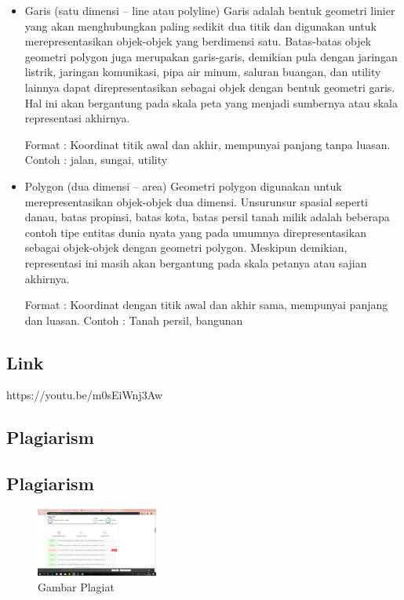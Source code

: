 \begin{itemize}
\item Garis (satu dimensi – line atau polyline)
Garis adalah bentuk geometri linier yang akan menghubungkan paling sedikit dua titik dan digunakan untuk merepresentasikan objek-objek yang berdimensi satu. Batas-batas objek geometri polygon juga merupakan garis-garis, demikian pula dengan jaringan listrik, jaringan komunikasi, pipa air minum, saluran buangan, dan utility lainnya dapat direpresentasikan sebagai objek dengan bentuk geometri garis. Hal ini akan bergantung pada skala peta yang menjadi sumbernya atau skala representasi akhirnya.

Format : Koordinat titik awal dan akhir, mempunyai panjang tanpa luasan.
Contoh : jalan, sungai, utility

\item Polygon (dua dimensi – area)
Geometri polygon digunakan untuk merepresentasikan objek-objek dua dimensi. Unsurunsur spasial seperti danau, batas propinsi, batas kota, batas persil tanah milik adalah beberapa contoh tipe entitas dunia nyata yang pada umumnya direpresentasikan sebagai objek-objek dengan geometri polygon. Meskipun demikian, representasi ini masih akan bergantung pada skala petanya atau sajian akhirnya.

Format : Koordinat dengan titik awal dan akhir sama, mempunyai panjang dan luasan.
Contoh : Tanah persil, bangunan

\end{itemize}
\subsection{Link}
https://youtu.be/m0sEiWnj3Aw

\subsection{Plagiarism}
\subsection{Plagiarism}
\begin{figure}[H]
	\includegraphics[width=4cm]{figures/Tugas1/1174069/plagiarism.png}
	\centering
	\caption{Gambar Plagiat}
\end{figure}

